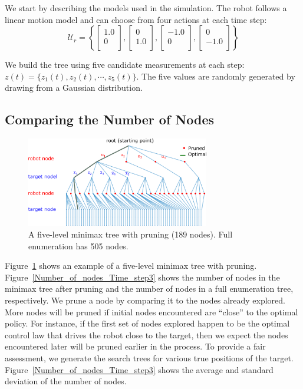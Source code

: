 \documentclass[journal]{IEEEtran}
\begin{document}
We start by describing the models used in the simulation. The robot follows a linear motion model and can choose from four actions at each time step:
 \begin{equation}
 \mathcal{U}_r=\left\{\begin{bmatrix}
    1.0    \\
   0   \\
\end{bmatrix}, \begin{bmatrix}
    0    \\
   1.0   \\
\end{bmatrix}, \begin{bmatrix}
    -1.0    \\
   0   \\
\end{bmatrix}, \begin{bmatrix}
   0    \\
   -1.0   \\
\end{bmatrix}\right\}
\label{eqn:simrobotmotionmodel}
\end{equation}

We build the tree using five candidate measurements at each step: $z(t)=\{z_1(t),z_2(t),\cdots, z_5(t) \}$. The five values are randomly generated by drawing from a Gaussian distribution.
 
\subsection{Comparing the Number of Nodes}

\begin{figure}[!htb]
  \centering
  \includegraphics[width=8cm]{figs/Minimax5result.eps}
  \caption{A five-level minimax tree with pruning (189 nodes). Full enumeration has 505 nodes.}
  \label{Minimax5result}
\end{figure}

Figure~\ref{Minimax5result} shows an example of a five-level minimax tree with pruning. Figure~\ref{Number_of_nodes_Time_step3} shows the number of nodes  in the minimax tree after pruning and the number of nodes in a full enumeration tree, respectively. We prune a node by comparing it to the nodes already explored. More nodes will be pruned if initial nodes encountered are ``close'' to the optimal policy. For instance, if the first set of nodes explored happen to be  the optimal control law that drives the robot close to the target, then we expect the nodes encountered later will be pruned earlier in the process. To provide a fair assessment, we generate the search trees for various true positions of the target. Figure~\ref{Number_of_nodes_Time_step3} shows the average and standard deviation of the number of nodes.
\end{document}
